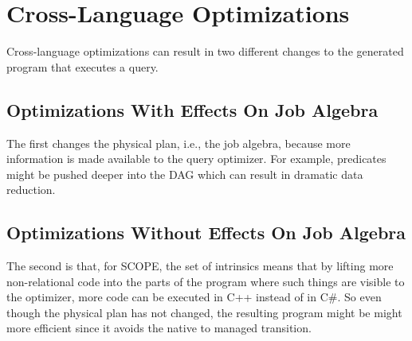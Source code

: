 \section{Cross-Language Optimizations}
Cross-language optimizations can result in two different changes to the generated program that executes a query.

\subsection{Optimizations With Effects On Job Algebra}
The first changes the physical plan, i.e., the job algebra, because more information is
made available to the query optimizer.
For example, predicates might be pushed deeper into the DAG which can result in dramatic data reduction.


\subsection{Optimizations Without Effects On Job Algebra}
The second is that, for SCOPE, the set of intrinsics means that by lifting more non-relational code into the parts of the program where such things are visible to the optimizer, more code can be executed in C++ instead of in C\#.
So even though the physical plan has not changed, the resulting program might be might more efficient since it avoids the native to managed transition.

